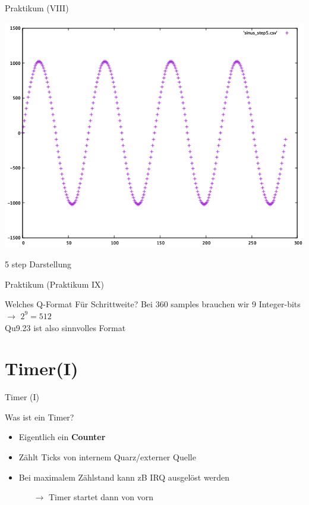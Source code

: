   \begin{frame} {Praktikum (VIII)}
    \begin{center}
      \includegraphics [height=.75\textheight]{figs/sinus_step5} 
    \end{center}
    \begin{block} {}
      5 step Darstellung
    \end{block}
  \end{frame}

  \begin{frame} {Praktikum (Praktikum IX)}
    \begin{block} {Welches Q-Format Für Schrittweite?}
      Bei 360 samples brauchen wir 9 Integer-bits $\rightarrow$ $2^9 = 512$ \\
      \vspace{0.5cm}
      Qu9.23 ist also sinnvolles Format
    \end{block}
  \end{frame}


  \section{Timer(I)}
  \begin{frame} {Timer (I)}
    \begin{block} {Was ist ein Timer?}
      \begin{itemize}
        \item Eigentlich ein \textbf{Counter}
        \item Zählt Ticks von internem Quarz/externer Quelle
        \item Bei maximalem Zählstand kann zB IRQ ausgelöst werden 
        \begin{itemize}
          \item[$\rightarrow$] Timer startet dann von vorn
        \end{itemize}
      \end{itemize}
    \end{block}
  \end{frame}

